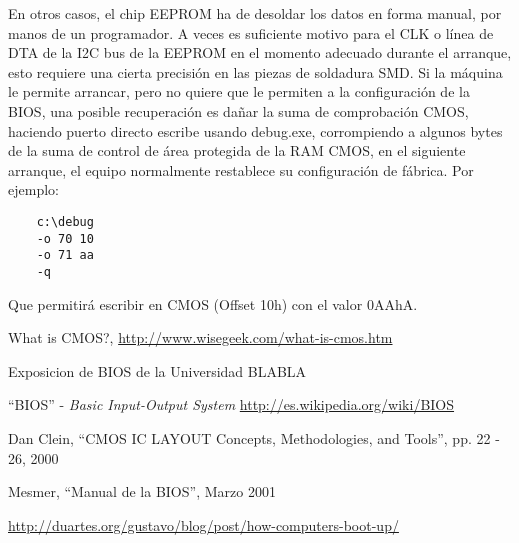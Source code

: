 \documentclass[12pt,oneside,a4paper]{article}
\begin{document}
	En otros casos, el chip EEPROM ha de desoldar los datos en forma manual,
	por manos de un programador. A veces es suficiente motivo para el CLK o
	línea de DTA de la I2C bus de la EEPROM en el momento adecuado durante el
	arranque, esto requiere una cierta precisión en las piezas de soldadura
	SMD. Si la máquina le permite arrancar, pero no quiere que le permiten a la
	configuración de la BIOS, una posible recuperación es dañar la suma de
	comprobación CMOS, haciendo puerto directo escribe usando debug.exe,
	corrompiendo a algunos bytes de la suma de control de área protegida de la
	RAM CMOS, en el siguiente arranque, el equipo normalmente restablece su
	configuración de fábrica. Por ejemplo:

	\begin{verbatim}
	c:\debug
	-o 70 10
	-o 71 aa
	-q
	\end{verbatim}

	Que permitirá escribir en CMOS (Offset 10h) con el valor 0AAhA.

	\newpage

\begin{thebibliography}{9}{\label{sec:bibliografia}}

		What is CMOS?,
		\url{http://www.wisegeek.com/what-is-cmos.htm}

		Exposicion de BIOS de la Universidad BLABLA

		``BIOS'' - {\em Basic Input-Output System}
		\url{http://es.wikipedia.org/wiki/BIOS}

		Dan Clein, ``CMOS IC LAYOUT Concepts, Methodologies, and Tools'', pp. 22 - 26, 2000

		Mesmer, ``Manual de la BIOS'', Marzo 2001
	
		\url{http://duartes.org/gustavo/blog/post/how-computers-boot-up/}

\end{thebibliography}
\end{document}
